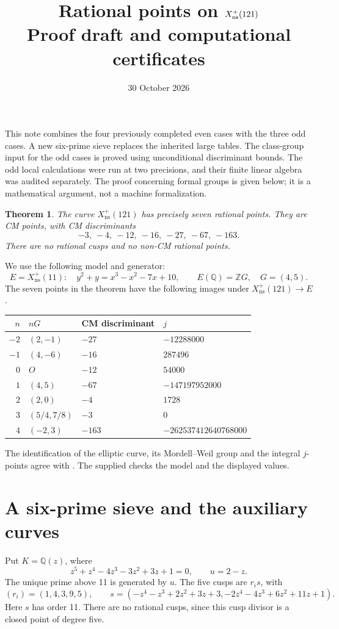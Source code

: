 \documentclass[11pt]{article}
\title{Rational points on \(X_{\ns}^{+}(121)\)\\
\large Proof draft and computational certificates}
\author{}\date{30 October 2026}
\newcommand{\Q}{\mathbb Q}\newcommand{\Z}{\mathbb Z}
\newcommand{\ns}{\mathrm{ns}}
\newtheorem{theorem}{Theorem}
\begin{document}
\maketitle

\noindent
This note combines the four previously completed even cases with the
three odd cases. A new six-prime sieve replaces the inherited large
tables. The class-group input for the odd cases is proved using
unconditional discriminant bounds. The odd local calculations were run
at two precisions, and their finite linear algebra was audited separately.
The proof concerning formal groups is given below; it is a mathematical
argument, not a machine formalization.

\begin{theorem}\label{thm:main}
The curve \(X_{\ns}^{+}(121)\) has precisely seven rational points.
They are CM points, with CM discriminants
\[
 -3,\ -4,\ -12,\ -16,\ -27,\ -67,\ -163.
\]
There are no rational cusps and no non-CM rational points.
\end{theorem}

We use the following model and generator:
\[
 E=X_{\ns}^{+}(11):\quad y^2+y=x^3-x^2-7x+10,
 \qquad E(\Q)=\Z G,\quad G=(4,5).
\]
The seven points in the theorem have the following images under
\(X_{\ns}^{+}(121)\longrightarrow E\).
\begin{center}\begin{tabular}{rlll}\toprule
\(n\)&\(nG\)&CM discriminant&\(j\)\\\midrule
\(-2\)&\((2,-1)\)&\(-27\)&\(-12288000\)\\
\(-1\)&\((4,-6)\)&\(-16\)&\(287496\)\\
\(0\)&\(O\)&\(-12\)&\(54000\)\\
\(1\)&\((4,5)\)&\(-67\)&\(-147197952000\)\\
\(2\)&\((2,0)\)&\(-4\)&\(1728\)\\
\(3\)&\((5/4,7/8)\)&\(-3\)&\(0\)\\
\(4\)&\((-2,3)\)&\(-163\)&\(-262537412640768000\)\\\bottomrule
\end{tabular}\end{center}
The identification of the elliptic curve, its Mordell--Weil group and
the integral \(j\)-points agree with \cite{ST}. The supplied
 checks the model and the displayed values.

\section{A six-prime sieve and the auxiliary curves}
Put \(K=\Q(z)\), where
\[
 z^5+z^4-4z^3-3z^2+3z+1=0,
 \qquad u=2-z.
\]
The unique prime above 11 is generated by \(u\). The five cusps are
\(r_i s\), with
\[
 (r_i)=(1,4,3,9,5),\qquad
 s=(-z^4-z^3+2z^2+3z+3,-2z^4-4z^3+6z^2+11z+1).
\]
Here \(s\) has order 11. There are no rational cusps, since this cusp
divisor is a closed point of degree five.
\end{document}
